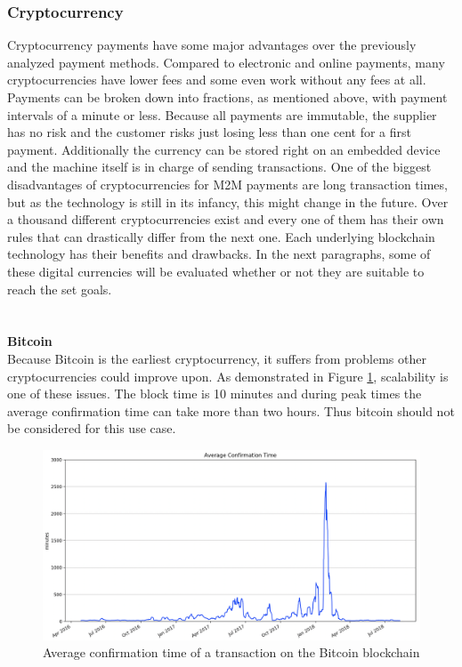 \subsubsection{Cryptocurrency}
Cryptocurrency payments have some major advantages over the previously analyzed payment methods.
Compared to electronic and online payments, many cryptocurrencies have lower fees and some even work without any fees at all.
Payments can be broken down into fractions, as mentioned above, with payment intervals of a minute or less.
Because all payments are immutable, the supplier has no risk and the customer risks just losing less than one cent for a first payment.
Additionally the currency can be stored right on an embedded device and the machine itself is in charge of sending transactions.
One of the biggest disadvantages of cryptocurrencies for M2M payments are long transaction times, but as the technology is still in its infancy, this might change in the future.
\newpage
Over a thousand different cryptocurrencies exist\cite{coincap} and every one of them has their own rules that can drastically differ from the next one.
Each underlying blockchain technology has their benefits and drawbacks.
In the next paragraphs, some of these digital currencies will be evaluated whether or not they are suitable to reach the set goals.
\\\\\\
\textbf{Bitcoin}\\
Because Bitcoin is the earliest cryptocurrency, it suffers from problems other cryptocurrencies could improve upon.
As demonstrated in Figure \ref{fig:BitcoinConfirmationTime}, scalability is one of these issues.
The block time is 10 minutes\cite{bitcoin-whitepaper} and during peak times the average confirmation time can take more than two hours.
Thus bitcoin should not be considered for this use case.
\\
\begin{figure}[H]
    \includegraphics[width=\textwidth]{img/average-confirmation-time.png}
    \caption{Average confirmation time of a transaction on the Bitcoin blockchain\cite{btc-conf-time}}
    \label{fig:BitcoinConfirmationTime}
\end{figure}
